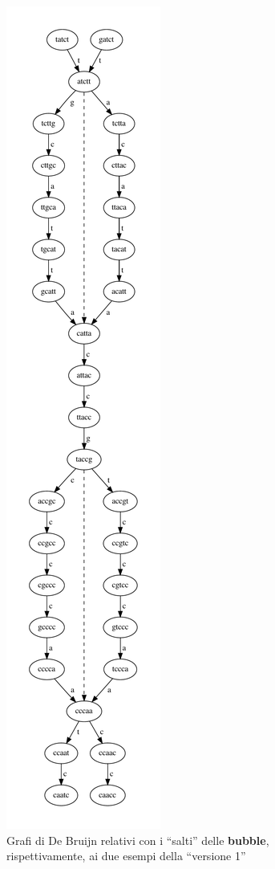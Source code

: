 \documentclass[a4paper,12pt, oneside]{book}
\begin{document}
\begin{figure}[H]
  \includegraphics[scale = 0.33]{img/mutns2.pdf}
  \caption{Grafi di De Bruijn relativi con i ``salti'' delle \textbf{bubble},
    rispettivamente, ai due esempi della ``versione 1''}
  \label{fig:dbg2}
\end{figure}
\end{document}
